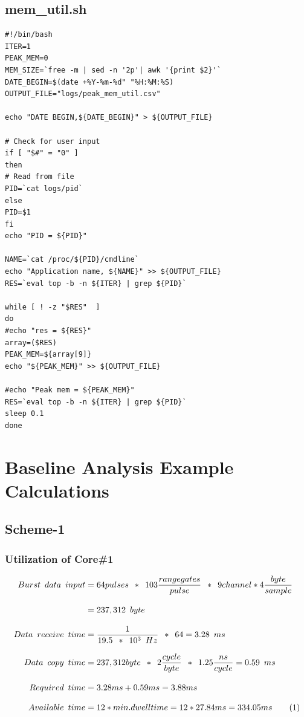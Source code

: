 \section{mem\_util.sh}
\label{app:code:mem_util}
\begin{lstlisting}[caption=Peak Memory Utilization]
#!/bin/bash
ITER=1
PEAK_MEM=0
MEM_SIZE=`free -m | sed -n '2p'| awk '{print $2}'`
DATE_BEGIN=$(date +%Y-%m-%d" "%H:%M:%S)
OUTPUT_FILE="logs/peak_mem_util.csv"

echo "DATE BEGIN,${DATE_BEGIN}" > ${OUTPUT_FILE}

# Check for user input
if [ "$#" = "0" ]
then
# Read from file
PID=`cat logs/pid`
else
PID=$1
fi
echo "PID = ${PID}"

NAME=`cat /proc/${PID}/cmdline`
echo "Application name, ${NAME}" >> ${OUTPUT_FILE}
RES=`eval top -b -n ${ITER} | grep ${PID}`

while [ ! -z "$RES"  ]
do
#echo "res = ${RES}"
array=($RES)
PEAK_MEM=${array[9]}
echo "${PEAK_MEM}" >> ${OUTPUT_FILE}

#echo "Peak mem = ${PEAK_MEM}"
RES=`eval top -b -n ${ITER} | grep ${PID}`
sleep 0.1
done
\end{lstlisting}
\cleardoublepage

\chapter{Baseline Analysis Example Calculations}
\label{app:ba:calc:scheme1}

\section{Scheme-1}
\subsection{Utilization of Core\#1}
\begin{align*}
	\label{aa:scheme1:core1:equ}
	Burst \enspace data \enspace input & = 64 pulses \enspace * \enspace 103 \frac{range gates}{pulse} \enspace * \enspace 9channel * 4\frac{byte}{sample}\\[0.3cm]
	& = 237,312 \enspace byte \\[0.3cm]
	Data \enspace receive \enspace time &= \frac{1}{19.5 \enspace * \enspace 10^{3} \enspace Hz} \enspace * \enspace 64 = 3.28 \enspace ms \\[0.3cm]
	Data \enspace copy \enspace time &= 237,312 byte \enspace * \enspace 2\frac{cycle}{byte} \enspace * \enspace 1.25\frac{ns}{cycle} = 0.59 \enspace ms \\[0.3cm]
	Required \enspace time &= 3.28ms + 0.59ms =  3.88ms\\[0.3cm]
	Available \enspace time &= 12 * min.dwelltime = 12*27.84ms = 334.05ms \stepcounter{equation}\tag{\theequation} 
\end{align*}

